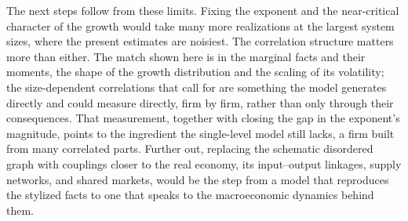 The next steps follow from these limits. Fixing the exponent and the near-critical
character of the growth would take many more realizations at the largest system sizes,
where the present estimates are noisiest. The correlation structure matters more than
either. The match shown here is in the marginal facts and their moments, the shape of the growth
distribution and the scaling of its volatility; the size-dependent correlations that
\citet{moran2024} call for are something the model generates directly and could measure
directly, firm by firm, rather than only through their consequences. That measurement,
together with closing the gap in the exponent's magnitude, points to the ingredient the
single-level model still lacks, a firm built from many correlated parts. Further out,
replacing the schematic disordered graph with couplings closer to the real economy, its
input--output linkages, supply networks, and shared markets, would be the step from a
model that reproduces the stylized facts to one that speaks to the macroeconomic dynamics
behind them.
